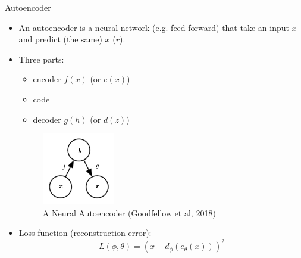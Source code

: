 \documentclass[10pt]{beamer}
\begin{document}
\begin{frame}{Autoencoder}

\begin{itemize}
\item An autoencoder is a neural network (e.g. feed-forward) that take an input $x$ and predict (the same) $x$ ($r$). \pause
\item Three parts:
\begin{itemize}
\item {\color{uured}encoder} $f(x)$ (or $e(x)$)
\item code
\item {\color{uured}decoder} $g(h)$ (or $d(z)$)
\end{itemize}

\begin{figure}[h]
\centering
\includegraphics[width=0.3\textwidth]{fig/DL_14_1_ae}
\caption{A Neural Autoencoder (Goodfellow et al, 2018)}
\end{figure}

\pause

\item Loss function ({\color{uured}reconstruction error}):
\[
L(\phi, \theta) = (x - d_\phi(e_\theta(x)))^2
\]
\end{itemize}

\end{frame}
\end{document}
